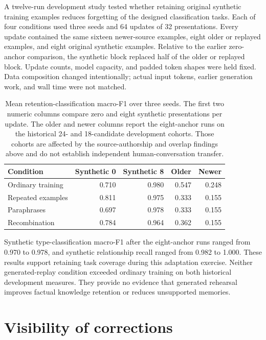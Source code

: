 A twelve-run development study tested whether retaining original synthetic
training examples reduces forgetting of the designed classification tasks.
Each of four conditions used three seeds and 64 updates of 32 presentations.
Every update contained the same sixteen newer-source examples, eight older or
replayed examples, and eight original synthetic examples. Relative to the
earlier zero-anchor comparison, the synthetic block replaced half of the
older or replayed block. Update counts, model capacity, and padded token shapes
were held fixed. Data composition changed intentionally; actual input tokens,
earlier generation work, and wall time were not matched.

\begin{table}[htbp]
\centering
\small
\begin{tabular}{lrrrr}
\toprule
Condition & Synthetic 0 & Synthetic 8 & Older & Newer \\
\midrule
Ordinary training & 0.710 & 0.980 & 0.547 & 0.248 \\
Repeated examples & 0.811 & 0.975 & 0.333 & 0.155 \\
Paraphrases & 0.697 & 0.978 & 0.333 & 0.155 \\
Recombination & 0.784 & 0.964 & 0.362 & 0.155 \\
\bottomrule
\end{tabular}
\caption{Mean retention-classification macro-F1 over three seeds. The first
two numeric columns compare zero and eight synthetic presentations per update.
The older and newer columns report the eight-anchor runs on the historical
24- and 18-candidate development cohorts. Those cohorts are affected by the
source-authorship and overlap findings above and do not establish independent
human-conversation transfer.}
\end{table}

Synthetic type-classification macro-F1 after the eight-anchor runs ranged from
0.970 to 0.978, and synthetic relationship recall ranged from 0.982 to 1.000.
These results support retaining task coverage during this adaptation exercise.
Neither generated-replay condition exceeded ordinary training on both
historical development measures. They provide no evidence that generated
rehearsal improves factual knowledge retention or reduces unsupported memories.

\section{Visibility of corrections}

